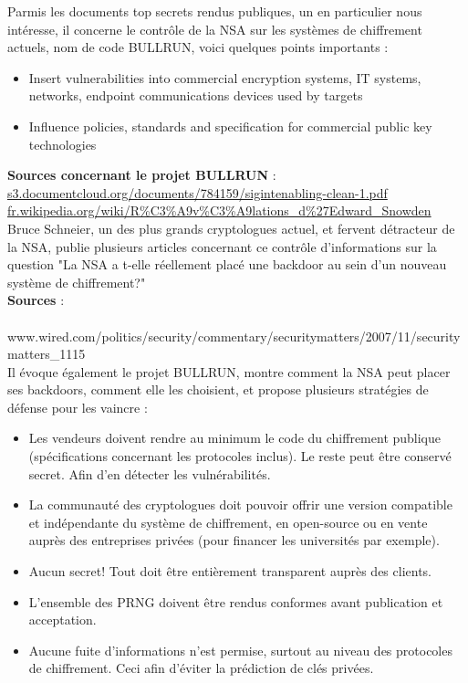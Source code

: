 \documentclass{article}
\begin{document}
	Parmis les documents top secrets rendus publiques, un en particulier
	nous intéresse, il concerne le contrôle de la NSA sur les systèmes
	de chiffrement actuels, nom de code BULLRUN,
	voici quelques points importants :
	\begin{itemize}
		\item Insert vulnerabilities into commercial encryption systems, IT 
		systems, networks, endpoint communications devices used by targets
		\item Influence policies, standards and specification for commercial 
		public key technologies\\
	\end{itemize}

	\textbf{Sources concernant le projet BULLRUN} :
	\href{http://s3.documentcloud.org/documents/784159/sigintenabling-clean-1.pdf}
	{s3.documentcloud.org/documents/784159/sigintenabling-clean-1.pdf}	
	\href{http://fr.wikipedia.org/wiki/R\%C3\%A9v\%C3\%A9lations\_d\%27Edward\_Snowden}
	{fr.wikipedia.org/wiki/R\%C3\%A9v\%C3\%A9lations\_d\%27Edward\_Snowden}\\
	
	Bruce Schneier, un des plus grands cryptologues actuel,
	et fervent détracteur de la NSA, publie plusieurs articles concernant
	ce contrôle d'informations sur la question "La NSA a t-elle 
	réellement placé une backdoor au sein d'un nouveau système de 
	chiffrement?" \\

	\textbf{Sources} : \\
	\href{http://www.wired.com/politics/security/commentary/securitymatters/2007/11/securitymatters\_1115}\\
	{www.wired.com/politics/security/commentary/securitymatters/2007/11/securitymatters\_1115}\\
	
	Il évoque également le projet BULLRUN, montre comment la NSA
	peut placer ses backdoors, comment elle les choisient, et propose 
	plusieurs stratégies de défense pour les vaincre : \\
	\begin{itemize}
	\item Les vendeurs doivent rendre au minimum le code du chiffrement
	publique (spécifications concernant les protocoles inclus). Le reste
	peut être conservé secret. Afin d'en détecter les vulnérabilités.
	\item La communauté des cryptologues doit pouvoir offrir une version
	compatible et indépendante du système de chiffrement, en open-source
	ou en vente auprès des entreprises privées (pour financer les
	universités par exemple).
	\item Aucun secret! Tout doit être entièrement transparent auprès des
	clients.
	\item L'ensemble des PRNG doivent être rendus conformes avant 
	publication et acceptation.
	\item Aucune fuite d'informations n'est permise, surtout au niveau
	des protocoles de chiffrement. Ceci afin d'éviter la prédiction de
	clés privées.
	\end{itemize}
	
\end{document}
